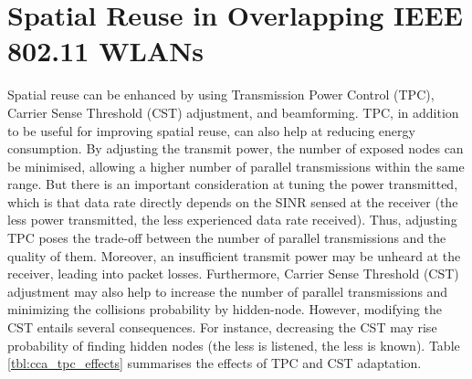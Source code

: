 \documentclass[12pt, a4paper,twoside]{tesi_upf}
\begin{document}
		\section{Spatial Reuse in Overlapping IEEE 802.11 WLANs}
		\label{section:spatial_reuse}	
			Spatial reuse can be enhanced by using Transmission Power Control (TPC), Carrier Sense Threshold (CST) adjustment, and beamforming. TPC, in addition to be useful for improving spatial reuse, can also help at reducing energy consumption. By adjusting the transmit power, the number of exposed nodes can be minimised, allowing a higher number of parallel transmissions within the same range. But there is an important consideration at tuning the power transmitted, which is that data rate directly depends on the SINR sensed at the receiver (the less power transmitted, the less experienced data rate received). Thus, adjusting TPC poses the trade-off between the number of parallel transmissions and the quality of them. Moreover, an insufficient transmit power may be unheard at the receiver, leading into packet losses. Furthermore, Carrier Sense Threshold (CST) adjustment may also help to increase the number of parallel transmissions and minimizing the collisions probability by hidden-node. However, modifying the CST entails several consequences. For instance, decreasing the CST may rise probability of finding hidden nodes (the less is listened, the less is known). Table \ref{tbl:cca_tpc_effects} summarises the effects of TPC and CST adaptation.			
\end{document}
